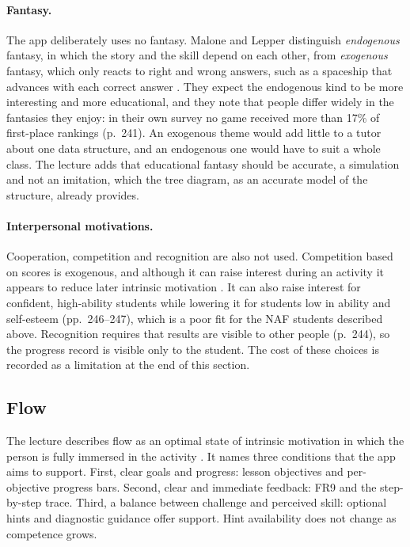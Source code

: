 \paragraph{Fantasy.} The app deliberately uses no fantasy. Malone and Lepper distinguish \emph{endogenous} fantasy, in which the story and the skill depend on each other, from \emph{exogenous} fantasy, which only reacts to right and wrong answers, such as a spaceship that advances with each correct answer \cite[p.~240]{Malone1987}. They expect the endogenous kind to be more interesting and more educational, and they note that people differ widely in the fantasies they enjoy: in their own survey no game received more than 17\% of first-place rankings (p.~241). An exogenous theme would add little to a tutor about one data structure, and an endogenous one would have to suit a whole class. The lecture adds that educational fantasy should be accurate, a simulation and not an imitation, which the tree diagram, as an accurate model of the structure, already provides.

\paragraph{Interpersonal motivations.} Cooperation, competition and recognition are also not used. Competition based on scores is exogenous, and although it can raise interest during an activity it appears to reduce later intrinsic motivation \cite[p.~244]{Malone1987}. It can also raise interest for confident, high-ability students while lowering it for students low in ability and self-esteem (pp.~246--247), which is a poor fit for the NAF students described above. Recognition requires that results are visible to other people (p.~244), so the progress record is visible only to the student. The cost of these choices is recorded as a limitation at the end of this section.

\subsection{Flow}
The lecture describes flow as an optimal state of intrinsic motivation in which the person is fully immersed in the activity \cite{Csikszentmihalyi1990}. It names three conditions that the app aims to support. First, clear goals and progress: lesson objectives and per-objective progress bars. Second, clear and immediate feedback: FR9 and the step-by-step trace. Third, a balance between challenge and perceived skill: optional hints and diagnostic guidance offer support. Hint availability does not change as competence grows.

